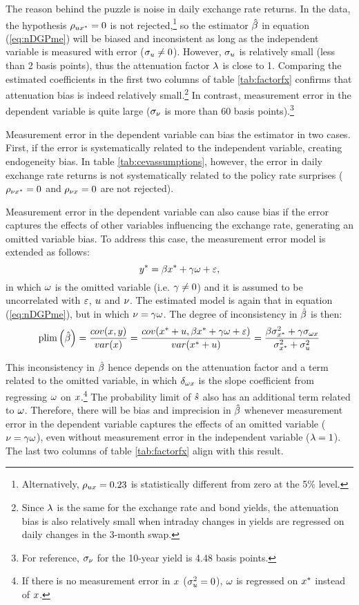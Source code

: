 The reason behind the puzzle is noise in daily exchange rate returns. In the data, the hypothesis \(\rho_{u x^{*}} = 0\) is not rejected,\footnote{Alternatively, \(\rho_{u x} = 0.23\) is statistically different from zero at the 5\% level.} so the estimator \(\hat{\beta}\) in equation (\ref{eq:nDGPme}) will be biased and inconsistent as long as the independent variable is measured with error (\(\sigma_{u} \neq 0\)). 
However, \(\sigma_{u}\) is relatively small (less than 2 basis points), thus the attenuation factor \(\lambda\) is close to 1. Comparing the estimated coefficients in the first two columns of table \ref{tab:factorfx} confirms that attenuation bias is indeed relatively small.\footnote{Since \(\lambda\) is the same for the exchange rate and bond yields, the attenuation bias is also relatively small when intraday changes in yields are regressed on daily changes in the 3-month swap.} In contrast, measurement error in the dependent variable is quite large (\(\sigma_{\nu}\) is more than 60 basis points).\footnote{For reference, \(\sigma_{\nu}\) for the 10-year yield is 4.48 basis points.} 

Measurement error in the dependent variable can bias the estimator in two cases. First, if the error is systematically related to the independent variable, creating endogeneity bias. In table \ref{tab:cevassumptions}, however, the error in daily exchange rate returns is not systematically related to the policy rate surprises (\(\rho_{\nu x^{*}} = 0\) and \(\rho_{\nu x} = 0\) are not rejected). 

Measurement error in the dependent variable can also cause bias if the error captures the effects of other variables influencing the exchange rate, generating an omitted variable bias. To address this case, the measurement error model is extended as follows:
\[y^{*} = \beta x^{*} + \gamma \omega + \varepsilon,\]
\noindent in which \(\omega\) is the omitted variable (i.e. \(\gamma \neq 0\)) and it is assumed to be uncorrelated with \(\varepsilon\), \(u\) and \(\nu\). The estimated model is again that in equation (\ref{eq:nDGPme}), but in which \(\nu = \gamma \omega\). The degree of inconsistency in \(\hat{\beta}\) is then:
\[\mathrm{plim} \left( \hat{\beta} \right) = \frac{cov(x, y)}{var(x)} = \frac{cov(x^{*} + u, \beta x^{*} + \gamma \omega + \varepsilon)}{var(x^{*} + u)} = \frac{\beta \sigma^{2}_{x^{*}} + \gamma \sigma_{\omega x}}{\sigma^{2}_{x^{*}} + \sigma^{2}_{u}}\]


This inconsistency in \(\hat{\beta}\) hence depends on the attenuation factor and a term related to the omitted variable, in which \(\delta_{\omega x}\) is the slope coefficient from regressing \(\omega\) on \(x\).\footnote{If there is no measurement error in \(x\) (\(\sigma^{2}_{u} = 0\)), \(\omega\) is regressed on \(x^{*}\) instead of \(x\).} The probability limit of \(\hat{s}\) also has an additional term related to \(\omega\). Therefore, there will be bias and imprecision in \(\hat{\beta}\) whenever measurement error in the dependent variable captures the effects of an omitted variable (\(\nu = \gamma \omega\)), even without measurement error in the independent variable (\(\lambda = 1\)). The last two columns of table \ref{tab:factorfx} align with this result.

